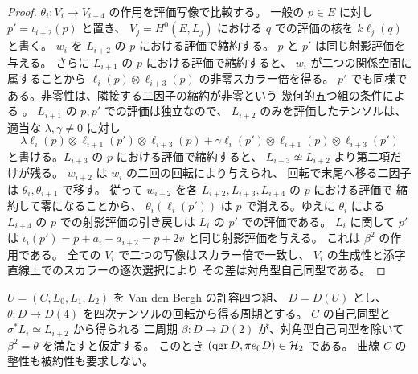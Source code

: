 \begin{proof}
$\theta_i:V_i\to V_{i+4}$ の作用を評価写像で比較する。
一般の $p\in E$ に対し $p'=\iota_{i+2}(p)$ と置き、
$V_j=H^0(E,L_j)$ における $q$ での評価の核を
$k\ell_j(q)$ と書く。
$w_i$ を $L_{i+2}$ の $p$ における評価で縮約する。
$p$ と $p'$ は同じ射影評価を与える。
さらに $L_{i+1}$ の $p$ における評価で縮約すると、
$w_i$ が二つの関係空間に属することから
$\ell_i(p)\otimes\ell_{i+3}(p)$ の非零スカラー倍を得る。
$p'$ でも同様である。非零性は、隣接する二因子の縮約が非零という
幾何的五つ組の条件による \cite[arXiv v3, Definition 5.3.1]{VdB2011}。
$L_{i+1}$ の $p,p'$ での評価は独立なので、
$L_{i+2}$ のみを評価したテンソルは、適当な $\lambda,\gamma\ne0$ に対し
\[
 \lambda\ell_i(p)\otimes\ell_{i+1}(p')\otimes\ell_{i+3}(p)
 +\gamma\ell_i(p')\otimes\ell_{i+1}(p)\otimes\ell_{i+3}(p')
\]
と書ける。$L_{i+3}$ の $p$ における評価で縮約すると、
$L_{i+3}\not\simeq L_{i+2}$ より第二項だけが残る。
$w_{i+2}$ は $w_i$ の二回の回転により与えられ、
回転で末尾へ移る二因子は $\theta_i,\theta_{i+1}$ で移す。
従って $w_{i+2}$ を各 $L_{i+2},L_{i+3},L_{i+4}$ の $p$ における評価で
縮約して零になることから、
$\theta_i(\ell_i(p'))$ は $p$ で消える。ゆえに $\theta_i$ による
$L_{i+4}$ の $p$ での射影評価の引き戻しは $L_i$ の $p'$ での評価である。
$L_i$ に関して $p'$ は
$\iota_i(p')=p+a_i-a_{i+2}=p+2v$ と同じ射影評価を与える。
これは $\beta^2$ の作用である。
全ての $V_i$ で二つの写像はスカラー倍で一致し、
$V_i$ の生成性と添字直線上でのスカラーの逐次選択により
その差は対角型自己同型である。
\end{proof}

\begin{proposition}[周期の平方から全公理への共通還元]
\label{prop:admissible-period-h2}
$U=(C,L_0,L_1,L_2)$ を Van den Bergh の許容四つ組、
$D=D(U)$ とし、$\theta:D\to D(4)$ を四次テンソルの回転から得る周期とする。
$C$ の自己同型と $\sigma^*L_i\simeq L_{i+2}$ から得られる
二周期 $\beta:D\to D(2)$ が、対角型自己同型を除いて
$\beta^2=\theta$ を満たすと仮定する。
このとき $(\operatorname{qgr} D,\pi e_0D)\in\mathcal H_2$ である。
曲線 $C$ の整性も被約性も要求しない。
\end{proposition}

